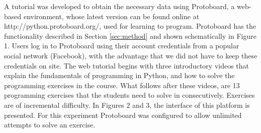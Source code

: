 \documentclass[conference]{IEEEtran}
\begin{document}
A tutorial was developed to
obtain the necessary data using Protoboard, a web-based environment,
whose latest version can be found online at
http://python.protoboard.org/, used for learning to
program. Protoboard has the functionality described in Section
\ref{sec:method} and shown schematically in Figure 1. %
Users log in to 
Protoboard using their account credentials from a popular social network
(Facebook), with the advantage that we did not have to keep these
credentials on site.  The web tutorial begins with three introductory videos that explain
the fundamentals of programming in Python, and how to solve the programming
exercises in the course. What follows after these videos, are 13 programming
exercises that the students need to solve in consecutively. Exercises are of
incremental difficulty. In Figures 2 and 3, %
 the interface of this platform is
presented. For this experiment Protoboard was configured to allow unlimited
attempts to solve an exercise.
\end{document}
